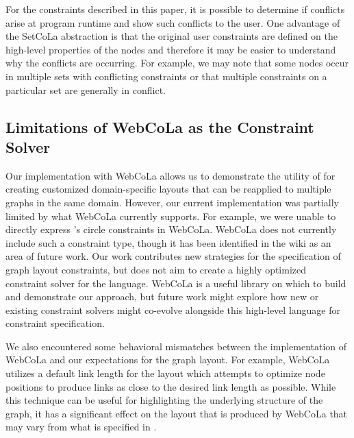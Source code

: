 For the constraints described in this paper, it is possible to determine if
conflicts arise at program runtime and show such conflicts to the user. One
advantage of the SetCoLa abstraction is that the original user constraints
are defined on the high-level properties of the nodes and therefore it may
be easier to understand why the conflicts are occurring. For example, we may
note that some nodes occur in multiple sets with conflicting constraints
or that multiple constraints on a particular set are generally in conflict.

\subsection{Limitations of WebCoLa as the Constraint Solver}



Our implementation with WebCoLa allows us to demonstrate the utility of
\projectname for creating customized domain-specific layouts that can be
reapplied to multiple graphs in the same domain. However, our current
implementation was partially limited by what WebCoLa currently supports. For
example, we were unable to directly express \projectname's circle constraints in
WebCoLa. WebCoLa does not currently include such a constraint type, though it
has been identified in the wiki as an area of future work. Our work contributes new strategies for the
specification of graph layout constraints, but does not aim to create a
highly optimized constraint solver for the language. WebCoLa is a useful
library on which to build and demonstrate our approach, but 
future work might explore how new or existing constraint solvers might
co-evolve alongside this high-level language for constraint specification.

We also encountered some behavioral mismatches between the implementation
of WebCoLa and our expectations for the graph layout. For example, WebCoLa
utilizes a default link length for the layout which attempts to optimize
node positions to produce links as close to the desired link length as
possible. While this technique can be useful for highlighting the underlying 
structure of the graph, it has a significant effect on the layout that is
produced by WebCoLa that may vary from what is specified in \projectname.

